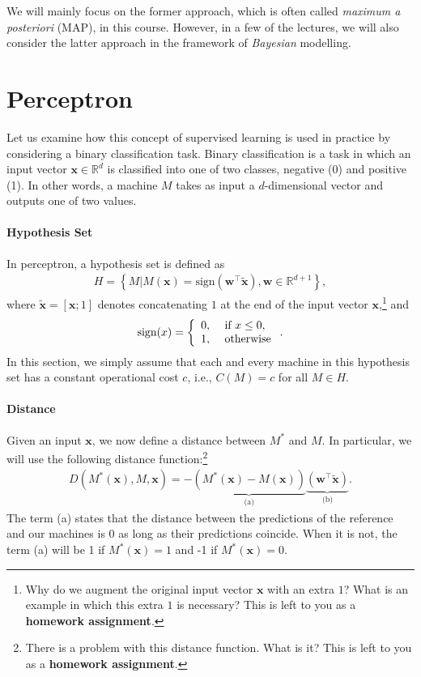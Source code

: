 \documentclass{report}
\newcommand{\vect}[1]{\mathbf{#1}}
\newcommand{\vx}[0]{\vect{x}}
\newcommand{\vw}[0]{\vect{w}}
\newcommand{\sign}{\text{sign}}
\begin{document}
We will mainly focus on the former approach, which is often called {\it maximum
a posteriori} (MAP), in this course. However, in a few of the lectures, we will
also consider the latter approach in the framework of {\it Bayesian} modelling.


\section{Perceptron}
\label{sec:perceptron}

Let us examine how this concept of supervised learning is used in practice by
considering a binary classification task. Binary classification is a task in
which an input vector $\vx \in \mathbb{R}^d$ is classified into one of two
classes, negative (0) and positive (1). In other words, a machine $M$ takes as
input a $d$-dimensional vector and outputs one of two values. 

\paragraph{Hypothesis Set}

In perceptron, a hypothesis set is defined as
\begin{align*}
    H = \left\{ 
    M | M(\vx) = \sign(\vw^\top \tilde{\vx}), \vw \in \mathbb{R}^{d+1}
    \right\},
\end{align*}
where $\tilde{\vx} = \left[ \vx; 1\right]$ denotes concatenating $1$ at the end
of the input vector $\vx$,\footnote{
    Why do we augment the original input vector $\vx$ with an extra $1$? What is
    an example in which this extra $1$ is necessary?  This is left to you as a
    {\bf homework assignment}.
}
and 
\begin{align}
    \label{eq:sign}
    \sign(x) = \left\{ \begin{array}{l l}
            0,&\text{ if } x \leq 0, \\
            1,&\text{ otherwise}
        \end{array}
        \right..
\end{align}
In this section, we simply assume that each and every machine in this hypothesis
set has a constant operational cost $c$, i.e., $C(M)=c$ for all $M\in H$. 

\paragraph{Distance}

Given an input $\vx$, we now define a distance between $M^*$ and $M$. In
particular, we will use the following distance function:\footnote{
    There is a problem with this distance function. What is it?  This is left to
    you as a {\bf homework assignment}.
}
\begin{align}
    \label{eq:perceptron_dist}
    D(M^*(\vx), M, \vx) = -\underbrace{\left( M^*(\vx) - M(\vx)
    \right)}_{\text{(a)}} \underbrace{\left(\vw^\top
    \tilde{\vx}\right)}_{\text{(b)}}.
\end{align}
The term (a) states that the distance between the predictions of the reference
and our machines is $0$ as long as their predictions coincide. When it is not,
the term (a) will be 1 if $M^*(\vx) = 1$ and -1 if $M^*(\vx) = 0$.
\end{document}
